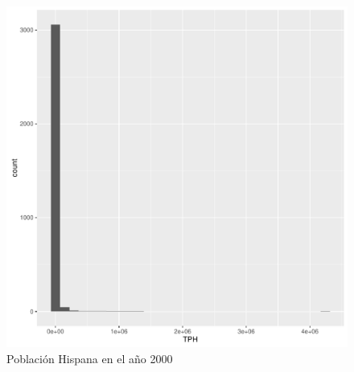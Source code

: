 \documentclass[conference]{IEEEtran}\usepackage[]{graphicx}\usepackage[]{color}
\makeatletter
\def\maxwidth{ %
  \ifdim\Gin@nat@width>\linewidth
    \linewidth
  \else
    \Gin@nat@width
  \fi
}
\newenvironment{knitrout}{}{} %
\makeatother
\begin{document}
\begin{figure}[H]
	\centering
\begin{knitrout}
\color{fgcolor}
\includegraphics[width=\maxwidth]{figure/pobHisp2000-1} 

\end{knitrout}
	\caption{Población Hispana en el año 2000}
\end{figure}
\end{document}
